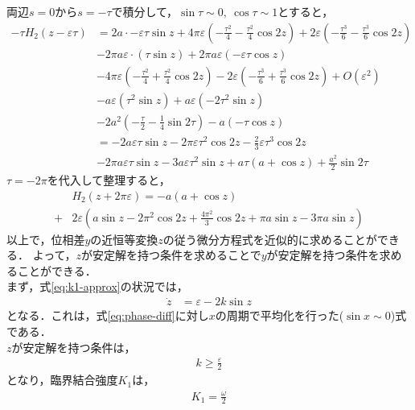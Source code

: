 \documentclass[../main]{subfiles}
\begin{document}
    両辺$s=0$から$s=-\tau$で積分して，$\sin\tau\sim 0,\ \cos\tau\sim 1$とすると，
    \begin{align*}
        -\tau H_2(z-\varepsilon \tau)&=2a\cdot -\varepsilon \tau\sin z+4\pi\varepsilon\left( -\frac{\tau^2}{4} -\frac{\tau^2}{4}\cos 2z\right)+2\varepsilon\left( -\frac{\tau^3}{6} -\frac{\tau^3}{6}\cos 2 z\right)\\
        &-2\pi a\varepsilon\cdot\left(\tau\sin z\right)+2\pi a\varepsilon\left(-\varepsilon \tau\cos z\right)\\
        &-4\pi\varepsilon\left(-\frac{\tau^2}{4}+\frac{\tau^2}{4}\cos 2 z\right)-2\varepsilon\left( -\frac{\tau^3}{6} +\frac{\tau^3}{6}\cos 2z\right)+O(\varepsilon^2)\\
        &-a\varepsilon\left( \tau^2\sin z \right)+a\varepsilon\left( -2\tau^2\sin z \right)\\
        &-2a^2\left( -\frac{\tau}{2}-\frac{1}{4} \sin 2\tau\right)-a\left( -\tau \cos z\right)\\
        &=-2a\varepsilon \tau\sin z-2\pi\varepsilon\tau^2\cos 2 z-\frac{2}{3}\varepsilon\tau^3\cos 2z\\
        &-2\pi a\varepsilon \tau\sin z-3a\varepsilon\tau^2\sin z+a\tau(a+\cos z)+\frac{a^2}{2}\sin 2\tau
    \end{align*}
    $\tau=-2\pi$を代入して整理すると，
    \begin{align*}
        &H_2(z+2\pi\varepsilon )=-a(a+\cos z)\\
        +&2\varepsilon\left( a\sin z-2\pi^2\cos2 z+\frac{4\pi^2}{3} \cos 2 z+\pi a\sin z-3\pi a\sin z\right)
    \end{align*}
    以上で，位相差$y$の近恒等変換$z$の従う微分方程式を近似的に求めることができる．
    よって，$z$が安定解を持つ条件を求めることで$y$が安定解を持つ条件を求めることができる．\\
    まず，式\eqref{eq:k1-approx}の状況では，
    \begin{align*}
        \dot{z}&=\varepsilon-2k\sin z
    \end{align*}
    となる．これは，式\eqref{eq:phase-diff}に対し$x$の周期で平均化を行った($\sin x\sim 0$)式である．\\
    $z$が安定解を持つ条件は，
    \begin{align*}
        k\geq\frac{\varepsilon}{2}
    \end{align*}
    となり，臨界結合強度$K_1$は，
    \begin{align*}
        K_1=\frac{\omega}{2}
    \end{align*}
\end{document}
